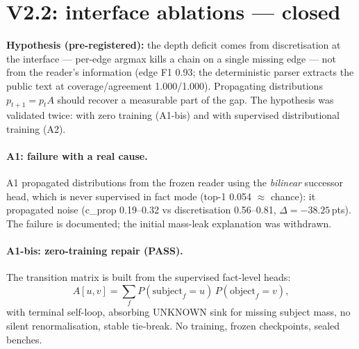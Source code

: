 \documentclass[11pt,a4paper]{article}
\newcommand{\dpt}{\ensuremath{\Delta}}
\begin{document}
\section{V2.2: interface ablations --- closed}
\label{sec:v22}

\textbf{Hypothesis (pre-registered):} the depth deficit comes from discretisation at the interface --- per-edge argmax kills a chain on a single missing edge --- not from the reader's information (edge F1 0.93; the deterministic parser extracts the public text at coverage/agreement 1.000/1.000). Propagating distributions $p_{t+1}=p_tA$ should recover a measurable part of the gap. The hypothesis was validated twice: with zero training (A1-bis) and with supervised distributional training (A2).

\paragraph{A1: failure with a real cause.} A1 propagated distributions from the frozen reader using the \emph{bilinear} successor head, which is never supervised in fact mode (top-1 0.054 $\approx$ chance): it propagated noise (c\_prop 0.19--0.32 vs discretisation 0.56--0.81, $\dpt=-38.25$\,pts). The failure is documented; the initial mass-leak explanation was withdrawn.

\paragraph{A1-bis: zero-training repair (PASS).} The transition matrix is built from the supervised fact-level heads:
\begin{equation}
A[u,v] = \sum_f P(\text{subject}_f=u)\,P(\text{object}_f=v),
\end{equation}
with terminal self-loop, absorbing UNKNOWN sink for missing subject mass, no silent renormalisation, stable tie-break. No training, frozen checkpoints, sealed benches.
\end{document}
